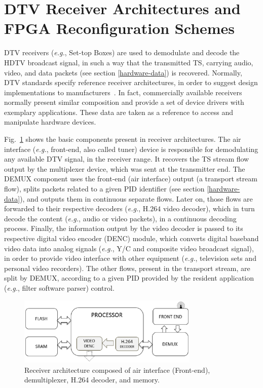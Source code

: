 \section{DTV Receiver Architectures and FPGA Reconfiguration Schemes}
\label{dtv-receiver}

DTV receivers ({\em e.g.}, Set-top Boxes) are used to demodulate and decode the HDTV broadcast signal, in such a way that the transmitted TS, carrying audio, video, and data packets (see section \ref{hardware-data}) is recovered. Normally, DTV standards specify reference receiver architectures, in order to suggest design implementations to manufacturers~\cite{ref27}. In fact, commercially available receivers normally present similar composition and provide a set of device drivers with exemplary applications. These data are taken as a reference to access and manipulate hardware devices. 

Fig.~\ref{figure:fig3} shows the basic components present in receiver architectures. The air interface ({\em e.g.}, front-end, also called tuner) device is responsible for demodulating any available DTV signal, in the receiver range. It recovers the TS stream flow output by the multiplexer device, which was sent at the transmitter end. The DEMUX component uses the front-end (air interface) output (a transport stream flow), splits packets related to a given PID identifier (see section \ref{hardware-data}), and outputs them in continuous separate flows. Later on, those flows are forwarded to their respective decoders ({\it e.g.}, H.$264$ video decoder), which in turn decode the content ({\em e.g.}, audio or video packets), in a continuous decoding process. Finally, the information output by the video decoder is passed to its respective digital video encoder (DENC) module, which converts digital baseband video data into analog signals ({\it e.g.}, Y/C and composite video broadcast signal), in order to provide video interface with other equipment ({\it e.g.}, television sets and personal video recorders). The other flows, present in the transport stream, are split by DEMUX, according to a given PID provided by the resident application ({\em e.g.}, filter software parser) control.

%
\begin{figure}[ht]
\centering
\includegraphics[width=3.4in]{images/Fig3.eps}
\caption{Receiver architecture composed of air interface (Front-end), demultiplexer, H.264 decoder, and memory.}
\label{figure:fig3}
\end{figure}
%

